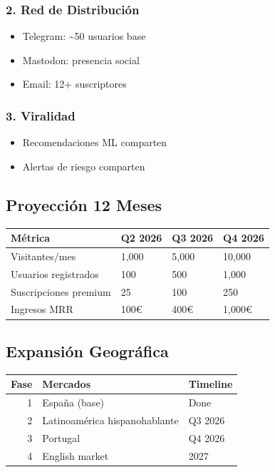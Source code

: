 \documentclass[11pt]{article}
\begin{document}
\subsubsection{2. Red de Distribución}
\label{sec:orgeaeb569}
\begin{itemize}
\item Telegram: \textasciitilde{}50 usuarios base
\item Mastodon: presencia social
\item Email: 12+ suscriptores
\end{itemize}

\subsubsection{3. Viralidad}
\label{sec:org8350b1a}
\begin{itemize}
\item Recomendaciones ML comparten
\item Alertas de riesgo comparten
\end{itemize}

\subsection{Proyección 12 Meses}
\label{sec:org06743dd}

\begin{center}
\begin{tabular}{llll}
Métrica & Q2 2026 & Q3 2026 & Q4 2026\\
\hline
Visitantes/mes & 1,000 & 5,000 & 10,000\\
Usuarios registrados & 100 & 500 & 1,000\\
Suscripciones premium & 25 & 100 & 250\\
Ingresos MRR & 100€ & 400€ & 1,000€\\
\end{tabular}
\end{center}

\subsection{Expansión Geográfica}
\label{sec:org9aaa7a6}

\begin{center}
\begin{tabular}{rll}
Fase & Mercados & Timeline\\
\hline
1 & España (base) & Done\\
2 & Latinoamérica hispanohablante & Q3 2026\\
3 & Portugal & Q4 2026\\
4 & English market & 2027\\
\end{tabular}
\end{center}
\end{document}
